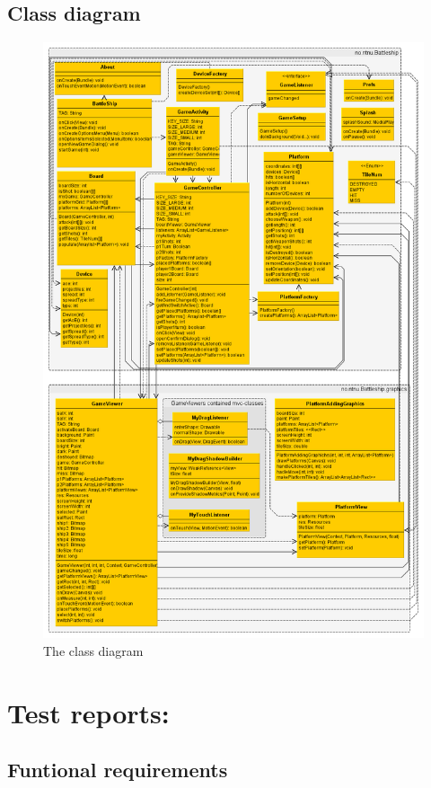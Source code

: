 \documentclass[12pt, a4paper]{article}
\begin{document}
\subsection{Class diagram}
\begin{figure}[h!]
    \centering
    \includegraphics[width=\textwidth]{classdiagram} 
    \caption{The class diagram}
    \label{fig:classdiagram}
\end{figure}

\section{Test reports:}
\subsection{Funtional requirements}
\end{document}
